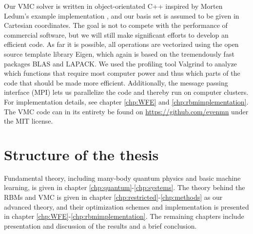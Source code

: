 Our VMC solver is written in object-orientated C++ inspired by Morten Ledum's example implementation \cite{ledum_simple_2016}, and our basis set is assumed to be given in Cartesian coordinates. The goal is not to compete with the performance of commercial software, but we will still make significant efforts to develop an efficient code. As far it is possible, all operations are vectorized using the open source template library Eigen, which again is based on the tremendously fast packages BLAS and LAPACK. We used the profiling tool Valgrind to analyze which functions that require most computer power and thus which parts of the code that should be made more efficient. Additionally, the message passing interface (MPI) lets us parallelize the code and thereby run on computer clusters. For implementation details, see chapter \ref{chp:WFE} and \ref{chp:rbmimplementation}. The VMC code can in its entirety be found on \url{https://github.com/evenmn} under the MIT license. 

\section{Structure of the thesis}
Fundamental theory, including many-body quantum physics and basic machine learning, is given in chapter \ref{chp:quantum}-\ref{chp:systems}. The theory behind the RBMs and VMC is given in chapter \ref{chp:restricted}-\ref{chp:methods} as our advanced theory, and their optimization schemes and implementation is presented in chapter \ref{chp:WFE}-\ref{chp:rbmimplementation}. The remaining chapters include presentation and discussion of the results and a brief conclusion.
